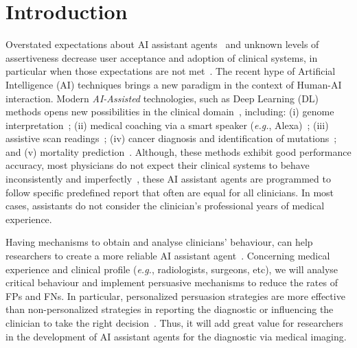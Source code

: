 \section{Introduction}
\label{sec:sec001}

Overstated expectations about AI assistant agents~\cite{https://doi.org/10.13140/rg.2.2.25412.68486, https://doi.org/10.13140/rg.2.2.33421.59360} and unknown levels of assertiveness decrease user acceptance and adoption of clinical systems, in particular when those expectations are not met~\cite{Inkpen:2019:HBG:3290607.3299002, Kocielnik:2019:YAI:3290605.3300641, Oh:2018:ILY:3173574.3174223}.
The recent hype of Artificial Intelligence (AI) techniques brings a new paradigm in the context of Human-AI interaction.
Modern {\it AI-Assisted} technologies, such as Deep Learning (DL) methods opens new possibilities in the clinical domain~\cite{topol2019high}, including:
(i) genome interpretation~\cite{sundaram2018predicting};
(ii) medical coaching via a smart speaker ({\it e.g.}, Alexa)~\cite{bickmore2018patient};
(iii) assistive scan readings~\cite{madani2018deep};
(iv) cancer diagnosis and identification of mutations~\cite{coudray2018classification}; and
(v) mortality prediction~\cite{ahmad2018death}.
Although, these methods exhibit good performance accuracy, most physicians do not expect their clinical systems to behave inconsistently and imperfectly~\cite{hoff2015trust, Kocielnik:2019:YAI:3290605.3300641}, these AI assistant agents are programmed to follow specific predefined report that often are equal for all clinicians.
In most cases, assistants do not consider the clinician's professional years of medical experience.


Having mechanisms to obtain and analyse clinicians' behaviour, can help researchers to create a more reliable AI assistant agent~\cite{Miao2019}.
Concerning medical experience and clinical profile ({\it e.g.}, radiologists, surgeons, etc), we will analyse critical behaviour and implement persuasive mechanisms to reduce the rates of FPs and FNs.
In particular, personalized persuasion strategies are more effective than non-personalized strategies in reporting the diagnostic or influencing the clinician to take the right decision~\cite{sonntag2016persuasive}.
Thus, it will add great value for researchers in the development of AI assistant agents for the diagnostic via medical imaging.

